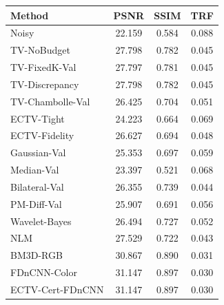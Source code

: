 \begin{tabular}{lccc}
\toprule
Method & PSNR & SSIM & TRF \\
\midrule
Noisy & 22.159 & 0.584 & 0.088 \\
TV-NoBudget & 27.798 & 0.782 & 0.045 \\
TV-FixedK-Val & 27.797 & 0.781 & 0.045 \\
TV-Discrepancy & 27.798 & 0.782 & 0.045 \\
TV-Chambolle-Val & 26.425 & 0.704 & 0.051 \\
ECTV-Tight & 24.223 & 0.664 & 0.069 \\
ECTV-Fidelity & 26.627 & 0.694 & 0.048 \\
Gaussian-Val & 25.353 & 0.697 & 0.059 \\
Median-Val & 23.397 & 0.521 & 0.068 \\
Bilateral-Val & 26.355 & 0.739 & 0.044 \\
PM-Diff-Val & 25.907 & 0.691 & 0.056 \\
Wavelet-Bayes & 26.494 & 0.727 & 0.052 \\
NLM & 27.529 & 0.722 & 0.043 \\
BM3D-RGB & 30.867 & 0.890 & 0.031 \\
FDnCNN-Color & 31.147 & 0.897 & 0.030 \\
ECTV-Cert-FDnCNN & 31.147 & 0.897 & 0.030 \\
\bottomrule
\end{tabular}
